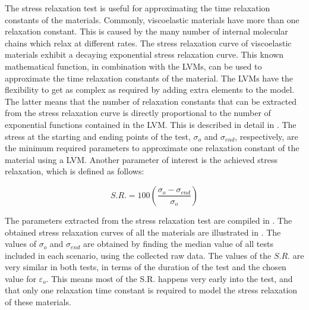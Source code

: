 The stress relaxation test is useful for approximating the time relaxation constants of the materials. Commonly, viscoelastic materials have more than one relaxation constant. This is caused by the many number of internal molecular chains which relax at different rates. The stress relaxation curve of viscoelastic materials exhibit a decaying exponential stress relaxation curve. This known mathematical function, in combination with the LVMs, can be used to approximate the time relaxation constants of the material. The LVMs have the flexibility to get as complex as required by adding extra elements to the model. The latter means that the number of relaxation constants that can be extracted from the stress relaxation curve is directly proportional to the number of exponential functions contained in the LVM. This is described in detail in . The stress at the starting and ending points of the test,  $\sigma_o$ and $\sigma_{end}$, respectively, are the minimum required parameters to approximate one relaxation constant of the material using a LVM. Another parameter of interest is the achieved stress relaxation, which is defined as follows:

\begin{equation}
	S.R. = 100\left( \frac{\sigma_o - \sigma_{end}}{\sigma_o}\right) 
\end{equation}

The parameters extracted from the stress relaxation test are compiled in . The obtained stress relaxation curves of all the materials are illustrated in . The values of $\sigma_o$ and $\sigma_{end}$ are obtained by finding the median value of all tests included in each scenario, using the collected raw data. The values of the $S.R.$ are very similar in both tests, in terms of the duration of the test and the chosen value for $\varepsilon_o$.  This means most of the S.R. happens very early into the test, and that only one relaxation time constant is required to model the stress relaxation of these materials.

